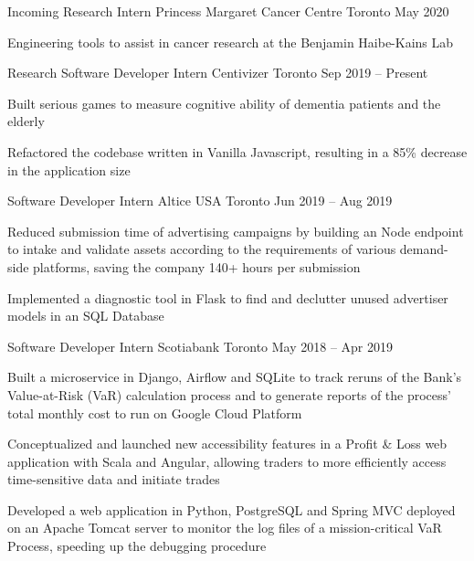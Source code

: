 \begin{cventries}
  \cventry
    {Incoming Research Intern}
    {Princess Margaret Cancer Centre}
    {Toronto}
    {May 2020}
    {}
    {
      \begin{cvitems}
        \item {Engineering tools to assist in cancer research at the Benjamin Haibe-Kains Lab}
      \end{cvitems}
    }
  \cventry
    {Research Software Developer Intern}
    {Centivizer}
    {Toronto}
    {Sep 2019 -- Present}
    {}
    {
      \begin{cvitems}
        \item {Built serious games to measure cognitive ability of dementia patients and the elderly}
        \item {Refactored the codebase written in Vanilla Javascript, resulting in a 85\% decrease in the application size}
      \end{cvitems}
    }
  \cventry
    {Software Developer Intern}
    {Altice USA}
    {Toronto}
    {Jun 2019 -- Aug 2019}
    {}
    {
    \begin{cvitems}
      \item {Reduced submission time of advertising campaigns by building an Node endpoint to intake and validate assets according to the requirements of various demand-side platforms, saving the company 140+ hours per submission}
      \item {Implemented a diagnostic tool in Flask to find and declutter unused advertiser models in an SQL Database}
    \end{cvitems}
    }
  \cventry
    {Software Developer Intern}
    {Scotiabank}
    {Toronto}
    {May 2018 -- Apr 2019}
    {}
    {
      \begin{cvitems}
        \item {Built a microservice in Django, Airflow and SQLite to track reruns of the Bank's Value-at-Risk (VaR) calculation process and to generate reports of the process' total monthly cost to run on Google Cloud Platform}
        \item {Conceptualized and launched new accessibility features in a Profit \& Loss web application with Scala and Angular, allowing traders to more efficiently access time-sensitive data and initiate trades}
        \item {Developed a web application in Python, PostgreSQL and Spring MVC deployed on an Apache Tomcat server to monitor the log files of a mission-critical VaR Process, speeding up the debugging procedure}
      \end{cvitems}
    }


\end{cventries}
